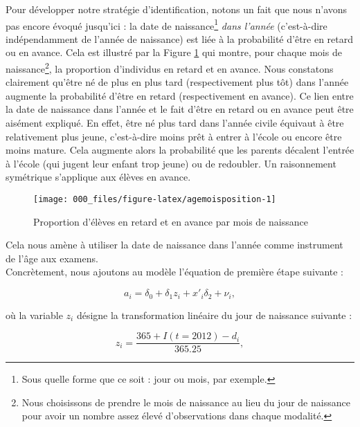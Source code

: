 \documentclass[
]{book}
\begin{document}
\quad Pour développer notre stratégie d'identification, notons un fait que nous n'avons pas encore évoqué jusqu'ici : la date de naissance\footnote{Sous quelle forme que ce soit : jour ou mois, par exemple.} \emph{dans l'année} (c'est-à-dire indépendamment de l'année de naissance) est liée à la probabilité d'être en retard ou en avance. Cela est illustré par la Figure \ref{fig:agemoisposition} qui montre, pour chaque mois de naissance\footnote{Nous choisissons de prendre le mois de naissance au lieu du jour de naissance pour avoir un nombre assez élevé d'observations dans chaque modalité.}, la proportion d'individus en retard et en avance. Nous constatons clairement qu'être né de plus en plus tard (respectivement plus tôt) dans l'année augmente la probabilité d'être en retard (respectivement en avance). Ce lien entre la date de naissance dans l'année et le fait d'être en retard ou en avance peut être aisément expliqué. En effet, être né plus tard dans l'année civile équivaut à être relativement plus jeune, c'est-à-dire moins prêt à entrer à l'école ou encore être moins mature. Cela augmente alors la probabilité que les parents décalent l'entrée à l'école (qui jugent leur enfant trop jeune) ou de redoubler. Un raisonnement symétrique s'applique aux élèves en avance.

\begin{figure}[H]

{\centering \texttt{[image: 000\_files/figure-latex/agemoisposition-1]} 

}

\caption{Proportion d'élèves en retard et en avance par mois de naissance}\label{fig:agemoisposition}
\end{figure}

Cela nous amène à utiliser la date de naissance dans l'année comme instrument de l'âge aux examens.\\
Concrètement, nous ajoutons au modèle l'équation de première étape suivante :

\begin{equation}
\label{eq:agepe}
a_{i} = \delta_0 + \delta_1 z_{i} + x'_{i} \delta_2 + \nu_{i}, 
\end{equation}

où la variable \(z_{i}\) désigne la transformation linéaire du jour de naissance suivante :

\[
z_{i} = \frac{365 + I(t = 2012) - d_{i}}{365.25}, 
\]
\end{document}
